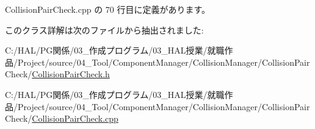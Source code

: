  Collision\+Pair\+Check.\+cpp の 70 行目に定義があります。



このクラス詳解は次のファイルから抽出されました\+:\begin{DoxyCompactItemize}
\item 
C\+:/\+H\+A\+L/\+P\+G関係/03\+\_\+作成プログラム/03\+\_\+\+H\+A\+L授業/就職作品/\+Project/source/04\+\_\+\+Tool/\+Component\+Manager/\+Collision\+Manager/\+Collision\+Pair\+Check/\mbox{\hyperlink{_collision_pair_check_8h}{Collision\+Pair\+Check.\+h}}\item 
C\+:/\+H\+A\+L/\+P\+G関係/03\+\_\+作成プログラム/03\+\_\+\+H\+A\+L授業/就職作品/\+Project/source/04\+\_\+\+Tool/\+Component\+Manager/\+Collision\+Manager/\+Collision\+Pair\+Check/\mbox{\hyperlink{_collision_pair_check_8cpp}{Collision\+Pair\+Check.\+cpp}}\end{DoxyCompactItemize}
